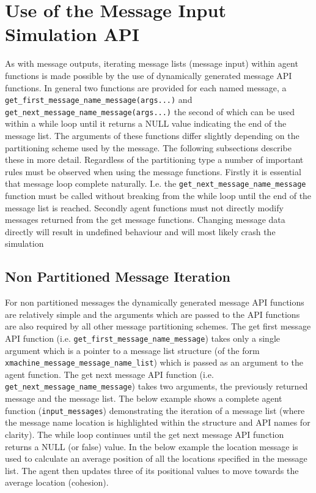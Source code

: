 \documentclass[11pt, a4paper, onecolumn, oneside]{report}
\begin{document}
\section{Use of the Message Input Simulation API}
\label{sec:35}

As with message outputs, iterating message lists (message input) within agent functions is made possible by the use of dynamically generated message API functions.
In general two functions are provided for each named message, a \texttt{get_first_message_name_message(args...)} and \texttt{get_next_message_name_message(args...)} the second of which can be used within a while loop until it returns a NULL value indicating the end of the message list.
The arguments of these functions differ slightly depending on the partitioning scheme used by the message.
The following subsections describe these in more detail.
Regardless of the partitioning type a number of important rules must be observed when using the message functions.
Firstly it is essential that message loop complete naturally.
I.e. the \texttt{get_next_message_name_message} function must be called without breaking from the while loop until the end of the message list is reached.
Secondly agent functions must not directly modify messages returned from the get message functions.
Changing message data directly will result in undefined behaviour and will most likely crash the simulation 


\subsection{Non Partitioned Message Iteration}
\label{sec:351}


For non partitioned messages the dynamically generated message API functions are relatively simple and the arguments which are passed to the API functions are also required by all other message partitioning schemes.
The get first message API function (i.e. \texttt{get_first_message_name_message}) takes only a single argument which is a pointer to a message list structure (of the form \texttt{xmachine_message_message_name_list}) which is passed as an argument to the agent function.
The get next message API function (i.e.
\texttt{get_next_message_name_message}) takes two arguments, the previously returned message and the message list.
The below example shows a complete agent function (\texttt{input_messages}) demonstrating the iteration of a message list (where the message name location is highlighted within the structure and API names for clarity).
The while loop continues until the get next message API function returns a NULL (or false) value.
In the below example the location message is used to calculate an average position of all the locations specified in the message list.
The agent then updates three of its positional values to move towards the average location (cohesion).
\end{document}
